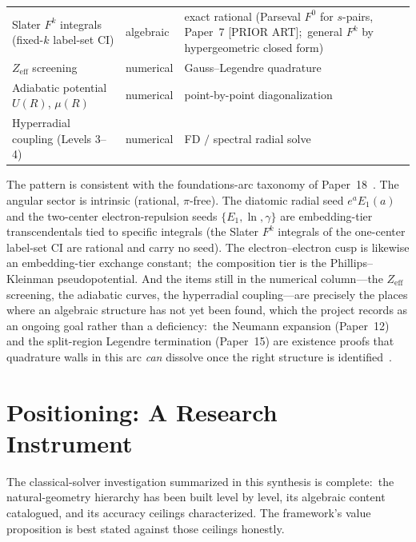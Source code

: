 \documentclass[aps,pra,twocolumn,superscriptaddress,longbibliography]{revtex4-2}
\begin{document}
\begin{table}[t]
\begin{tabular}{l l l}
Slater $F^k$ integrals (fixed-$k$ label-set CI) & algebraic & exact rational (Parseval $F^0$ for $s$-pairs, Paper~7 [PRIOR ART];\ general $F^k$ by hypergeometric closed form) \cite{loutey_paper7, loutey_paper13, loutey_fci_atoms} \\
$Z_{\mathrm{eff}}$ screening & numerical & Gauss--Legendre quadrature \cite{loutey_paper15, loutey_paper17} \\
Adiabatic potential $U(R)$, $\mu(R)$ & numerical & point-by-point diagonalization \cite{loutey_paper13} \\
Hyperradial coupling (Levels 3--4) & numerical & FD $/$ spectral radial solve \cite{loutey_paper13, loutey_paper15} \\
\bottomrule
\end{tabular}
\end{table}

The pattern is consistent with the foundations-arc taxonomy of
Paper~18~\cite{loutey_paper18}.  The angular sector is intrinsic
(rational, $\pi$-free).  The diatomic radial seed $e^a E_1(a)$ and the
two-center electron-repulsion seeds $\{E_1, \ln, \gamma\}$ are
embedding-tier transcendentals tied to specific integrals (the Slater
$F^k$ integrals of the one-center label-set CI are rational and carry no
seed).  The electron--electron cusp is likewise an embedding-tier
exchange constant;\ the composition tier is the Phillips--Kleinman
pseudopotential.  And the items still in the numerical column---the
$Z_{\mathrm{eff}}$ screening, the adiabatic curves, the hyperradial
coupling---are precisely the places where an algebraic structure has
not yet been found, which the project records as an ongoing goal rather
than a deficiency:\ the Neumann expansion (Paper~12) and the
split-region Legendre termination (Paper~15) are existence proofs that
quadrature walls in this arc \emph{can} dissolve once the right
structure is identified~\cite{loutey_paper12, loutey_paper15}.

\section{Positioning: A Research Instrument}
\label{sec:positioning}

The classical-solver investigation summarized in this synthesis is
complete:\ the natural-geometry hierarchy has been built level by level,
its algebraic content catalogued, and its accuracy ceilings
characterized.  The framework's value proposition is best stated against
those ceilings honestly.
\end{document}
